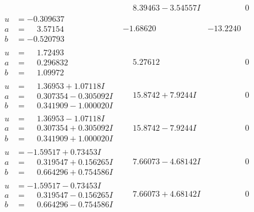 \documentclass[1p]{elsarticle_modified}
\theoremstyle{definition}
\begin{document}
$$\begin{array}{c|c|c}
 & \phantom{-}8.39463 - 3.54557 I & \phantom{-0.000000 } 0 \\ \hline\begin{aligned}
u &= -0.309637\phantom{ +0.000000I} \\
a &= \phantom{-}3.57154\phantom{ +0.000000I} \\
b &= -0.520793\phantom{ +0.000000I}\end{aligned}
 & -1.68620\phantom{ +0.000000I} & -13.2240\phantom{ +0.000000I} \\ \hline\begin{aligned}
u &= \phantom{-}1.72493\phantom{ +0.000000I} \\
a &= \phantom{-}0.296832\phantom{ +0.000000I} \\
b &= \phantom{-}1.09972\phantom{ +0.000000I}\end{aligned}
 & \phantom{-}5.27612\phantom{ +0.000000I} & \phantom{-0.000000 } 0 \\ \hline\begin{aligned}
u &= \phantom{-}1.36953 + 1.07118 I \\
a &= \phantom{-}0.307354 - 0.305092 I \\
b &= \phantom{-}0.341909 - 1.000020 I\end{aligned}
 & \phantom{-}15.8742 + 7.9244 I & \phantom{-0.000000 } 0 \\ \hline\begin{aligned}
u &= \phantom{-}1.36953 - 1.07118 I \\
a &= \phantom{-}0.307354 + 0.305092 I \\
b &= \phantom{-}0.341909 + 1.000020 I\end{aligned}
 & \phantom{-}15.8742 - 7.9244 I & \phantom{-0.000000 } 0 \\ \hline\begin{aligned}
u &= -1.59517 + 0.73453 I \\
a &= \phantom{-}0.319547 + 0.156265 I \\
b &= \phantom{-}0.664296 + 0.754586 I\end{aligned}
 & \phantom{-}7.66073 - 4.68142 I & \phantom{-0.000000 } 0 \\ \hline\begin{aligned}
u &= -1.59517 - 0.73453 I \\
a &= \phantom{-}0.319547 - 0.156265 I \\
b &= \phantom{-}0.664296 - 0.754586 I\end{aligned}
 & \phantom{-}7.66073 + 4.68142 I & \phantom{-0.000000 } 0 \\ \hline\begin{aligned}

\end{aligned}
\end{array}$$
\end{document}
